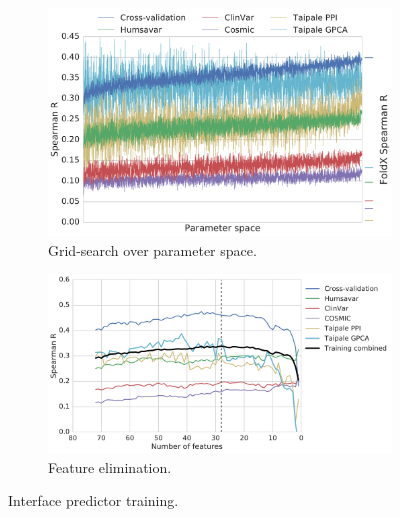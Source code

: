 \begin{figure}[ht]
	\centering

	\begin{subfigure}[b]{1.0\textwidth}
		\centering
		\includegraphics[width=0.6\linewidth]{static/elaspic_training_set/machine_learning/gridsearch_interface.pdf}
		\caption{Grid-search over parameter space.}
		\label{fig:gridsearch_interface}
	\end{subfigure}

	\begin{subfigure}[b]{1\textwidth}
		\centering
		\includegraphics[width=0.75\linewidth]{static/elaspic_training_set/machine_learning/feature_elimination_interface.pdf}
		\caption{Feature elimination.}
		\label{fig:feature_elimination_interface}
	\end{subfigure}

	\caption{Interface predictor training.}
\end{figure}


